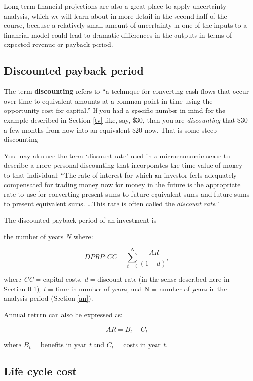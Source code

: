 \documentclass[10pt]{article}
\begin{document}
Long-term financial projections are also a great place to apply uncertainty analysis, which we will learn about in more detail in the second half of the course, because a relatively small amount of uncertainty in one of the inputs to a financial model could lead to dramatic differences in the outputs in terms of expected revenue or payback period.

\subsection{Discounted payback period}
\label{dp}

The term \textbf{discounting} refers to ``a technique for converting cash flows that occur over time to equivalent amounts at a common point in time using the opportunity cost for capital.'' \cite{Goswami2007-hf} If you had a specific number in mind for the example described in Section \ref{tv} like, say, \$30, then you are \textit{discounting} that \$30 a few months from now into an equivalent \$20 now. That is some steep discounting!

You may also see the term `discount rate' used in a microeconomic sense to describe a more personal discounting that incorporates the time value of money to that individual: ``The rate of interest for which an investor feels adequately compensated for trading money now for money in the future is the appropriate rate to use for converting present sums to future equivalent sums and future sums to present equivalent sums. \ldots This rate is often called the \textit{discount rate}.'' {\color{blue} \cite{Goswami2007-hf}}

The discounted payback period of an investment is {\color{blue}the number of years $N$ where: 

$$
DPBP: CC =\sum_{t=0}^{N} \frac{AR}{(1+d)^t}
$$
}

where \textit{CC} = capital costs, \textit{d} = discount rate (in the sense described here in Section \ref{dp}), \textit{t} = time in number of years, and N = number of years in the analysis period (Section \ref{an}).

Annual return can also be expressed as:

$$AR=B_t-C_t$$

where $B_t$ = benefits in year \textit{t} and $C_t$ = costs in year \textit{t}. \cite{Goswami2007-hf}

\subsection{Life cycle cost}
\end{document}
